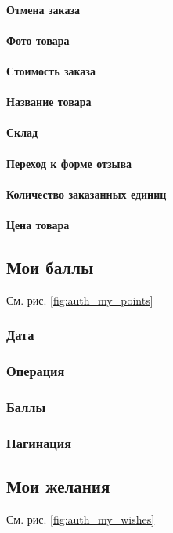                 \paragraph{Отмена заказа}
                \paragraph{Фото товара}
                \paragraph{Стоимость заказа}
                \paragraph{Название товара}
                \paragraph{Склад}
                \paragraph{Переход к форме отзыва}
                \paragraph{Количество заказанных единиц}
                \paragraph{Цена товара}
            
        \subsection{Мои баллы}

            См. рис. \ref{fig:auth_my_points}
        
            \subsubsection{Дата}
            \subsubsection{Операция}
            \subsubsection{Баллы}
            \subsubsection{Пагинация}
            
        \subsection{Мои желания}
            \label{sec:auth_my_wishes}
            См. рис. \ref{fig:auth_my_wishes}
        
        
        
